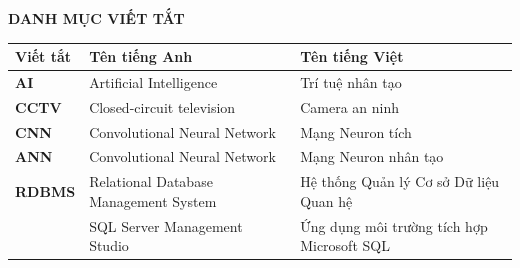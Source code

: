 \documentclass[../DoAn.tex]{subfiles}
\begin{document}
\begin{center}
	\Large{\textbf{DANH MỤC VIẾT TẮT}}\\
\end{center}
\begin{longtable}{l p{6cm} p{7cm}}
	\hline
	\textbf{Viết tắt} & \textbf{Tên tiếng Anh}                & \textbf{Tên tiếng Việt}                    \\ \hline
	\textbf{AI}       & Artificial Intelligence               & Trí tuệ nhân tạo                           \\
	\textbf{CCTV}     & Closed-circuit television             & Camera an ninh                             \\
	\textbf{CNN}      & Convolutional Neural Network          & Mạng Neuron tích                           \\
	\textbf{ANN}      & Convolutional Neural Network          & Mạng Neuron nhân tạo                       \\
	\textbf{RDBMS}    & Relational Database Management System & Hệ thống Quản lý Cơ sở Dữ liệu Quan hệ     \\
	\textbf{}         & SQL Server Management Studio          & Ứng dụng môi trường tích hợp Microsoft SQL \\
	\hline
\end{longtable}
\end{document}
